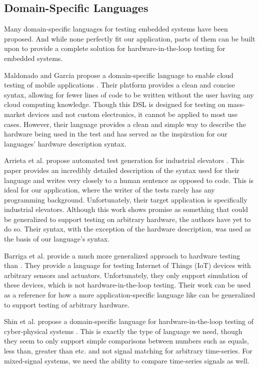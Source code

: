 \documentclass[sigconf,authordraft]{acmart}
\begin{document}
\subsection{Domain-Specific Languages}

Many domain-specific languages for testing embedded systems have been proposed. And while none perfectly fit our application, parts of them can be built upon to provide a complete solution for hardware-in-the-loop testing for embedded systems.

Maldonado and Garcia propose a domain-specific language to enable cloud testing of mobile applications \cite{DSL:MobileApp}. Their platform provides a clean and concise syntax, allowing for fewer lines of code to be written without the user having any cloud computing knowledge. Though this DSL is designed for testing on mass-market devices and not custom electronics, it cannot be applied to most use cases. However, their language provides a clean and simple way to describe the hardware being used in the test and has served as the inspiration for our languages' hardware description syntax.

Arrieta et al. propose automated test generation for industrial elevators \cite{DSL:Elevators}. This paper provides an incredibly detailed description of the syntax used for their language and writes very closely to a human sentence as opposed to code. This is ideal for our application, where the writer of the tests rarely has any programming background. Unfortunately, their target application is specifically industrial elevators. Although this work shows promise as something that could be generalized to support testing on arbitrary hardware, the authors have yet to do so. Their syntax, with the exception of the hardware description, was used as the basis of our language's syntax.

Barriga et al. provide a much more generalized approach to hardware testing \cite{DSL:SimulateIoT} than \cite{DSL:Elevators}. They provide a language for testing Internet of Things (IoT) devices with arbitrary sensors and actuators. Unfortunately, they only support simulation of these devices, which is not hardware-in-the-loop testing. Their work can be used as a reference for how a more application-specific language like \cite{DSL:Elevators} can be generalized to support testing of arbitrary hardware.

Shin et al. propose a domain-specific language for hardware-in-the-loop testing of cyber-physical systems \cite{DSL:CyberPhysical}. This is exactly the type of language we need, though they seem to only support simple comparisons between numbers such as equals, less than, greater than etc. and not signal matching for arbitrary time-series. For mixed-signal systems, we need the ability to compare time-series signals as well.
\end{document}
